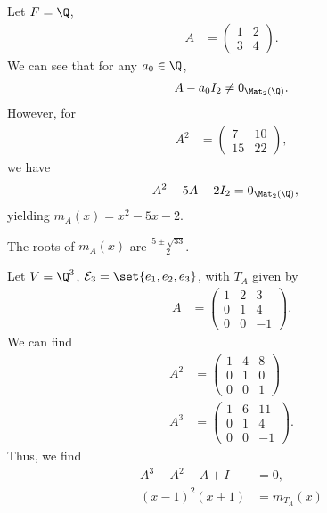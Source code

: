 \documentclass[10pt]{mypackage}
\begin{document}
\begin{example}
  Let $F = \Q$,
  \begin{align*}
    A &= \begin{pmatrix}1 & 2 \\ 3 & 4\end{pmatrix}.
  \end{align*}
  We can see that for any $a_0\in \Q$,
  \begin{align*}
    A - a_0I_{2} \neq 0_{\Mat_{2}\left(\Q\right)}.
  \end{align*}
  However, for
  \begin{align*}
    A^2 &= \begin{pmatrix}7 & 10 \\ 15 & 22\end{pmatrix},
  \end{align*}
  we have
  \begin{align*}
    A^2 - 5A - 2I_{2} &= 0_{\Mat_{2}\left(\Q\right)},
  \end{align*}
  yielding $m_{A}\left(x\right) = x^2 - 5x - 2$.\newline

  The roots of $m_A(x)$ are $\frac{5\pm \sqrt{33}}{2}$.
\end{example}
\begin{example}
  Let $V = \Q^3$, $\mathcal{E}_3 = \set{e_1,e_2,e_3}$, with $T_A$ given by
  \begin{align*}
    A &= \begin{pmatrix}1 & 2 & 3 \\ 0 & 1 & 4 \\ 0 & 0 & -1\end{pmatrix}.
  \end{align*}
  We can find
  \begin{align*}
    A^2 &= \begin{pmatrix}1 & 4 & 8 \\ 0 & 1 & 0 \\ 0 & 0 & 1\end{pmatrix}\\
    A^3 &= \begin{pmatrix}1 & 6 & 11 \\ 0 & 1 & 4 \\ 0 & 0 & -1\end{pmatrix}.
  \end{align*}
  Thus, we find
  \begin{align*}
    A^3 - A^2 - A + I &= 0,\\
    \left(x-1\right)^2 \left(x+1\right) &= m_{T_A}\left(x\right)
  \end{align*}
\end{example}
\end{document}
